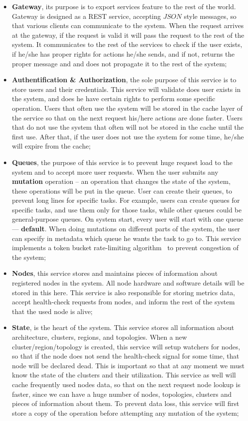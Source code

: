 \begin{itemize}
	\item \textbf{Gateway}, its purpose is to export services feature to the rest of the world. Gateway is designed as a REST service, accepting $JSON$ style messages, so that various clients can communicate to the system. When the request arrives at the gateway, if the request is valid it will pass the request to the rest of the system. It communicates to the rest of the services to check if the user exists, if he/she has proper rights for actions he/she sends, and if not, returns the proper message and and does not propagate it to the rest of the system;
	\item \textbf{Authentification \& Authorization}, the sole purpose of this service is to store users and their credentials. This service will validate does user exists in the system, and does he have certain rights to perform some specific operation. Users that often use the system will be stored in the cache layer of the service so that on the next request his/here actions are done faster. Users that do not use the system that often will not be stored in the cache until the first use. After that, if the user does not use the system for some time, he/she will expire from the cache;
	\item \textbf{Queues}, the purpose of this service is to prevent huge request load to the system and to accept more user requests. When the user submits any \textbf{mutation} operation -- an operation that changes the state of the system, these operations will be put in the queue. User can create their queues, to prevent long lines for specific tasks. For example, users can create queues for specific tasks, and use them only for those tasks, while other queues could be general-purpose queues. On system start, every user will start with one queue --- \textbf{default}. When doing mutations on different parts of the system, the user can specify in metadata which queue he wants the task to go to. This service implements a token bucket rate-limiting algorithm~\cite{MathewsKG17} to prevent congestion of the system;
	\item \textbf{Nodes}, this service stores and maintains pieces of information about registered nodes in the system. All node hardware and software details will be stored in this here. This service is also responsible for storing metrics data, accept health-check requests from nodes, and inform the rest of the system that the used node is alive;
	\item \textbf{State}, is the heart of the system. This service stores all information about architecture, clusters, regions, and topologies. When a new cluster/region/topology is created, this service will setup watchers for nodes, so that if the node does not send the health-check signal for some time, that node will be declared dead. This is important so that at any moment we must know the state of the clusters and their utilization. This service as well will cache frequently used nodes data, so that on the next request node lookup is faster, since we can have a huge number of nodes, topologies, clusters and pieces of information about them. To prevent data loss, this service will first store a copy of the operation before attempting any mutation of the system;

\end{itemize}
